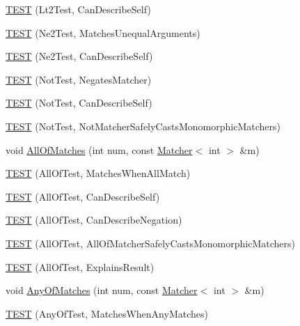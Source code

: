 \begin{DoxyCompactItemize}
\item 
\hyperlink{namespacetesting_1_1gmock__matchers__test_a9f557c4688b2907704650cc18cfd9dcf}{T\+E\+ST} (Lt2\+Test, Can\+Describe\+Self)
\item 
\hyperlink{namespacetesting_1_1gmock__matchers__test_a69692057d2825f6fc8a37265667867c7}{T\+E\+ST} (Ne2\+Test, Matches\+Unequal\+Arguments)
\item 
\hyperlink{namespacetesting_1_1gmock__matchers__test_acedf2eda13385067ee70bdb7d6073427}{T\+E\+ST} (Ne2\+Test, Can\+Describe\+Self)
\item 
\hyperlink{namespacetesting_1_1gmock__matchers__test_ab41b57eeaea5568064b6ed3725316c73}{T\+E\+ST} (Not\+Test, Negates\+Matcher)
\item 
\hyperlink{namespacetesting_1_1gmock__matchers__test_a831db2bf90c3950953cdceaefebddd40}{T\+E\+ST} (Not\+Test, Can\+Describe\+Self)
\item 
\hyperlink{namespacetesting_1_1gmock__matchers__test_a46849e0c019e331f830ed91137fa417a}{T\+E\+ST} (Not\+Test, Not\+Matcher\+Safely\+Casts\+Monomorphic\+Matchers)
\item 
void \hyperlink{namespacetesting_1_1gmock__matchers__test_a51d8731c3824a6acdaa594645dd46779}{All\+Of\+Matches} (int num, const \hyperlink{classtesting_1_1_matcher}{Matcher}$<$ int $>$ \&m)
\item 
\hyperlink{namespacetesting_1_1gmock__matchers__test_a7714d041eb2dd2e233db7f175fedef5a}{T\+E\+ST} (All\+Of\+Test, Matches\+When\+All\+Match)
\item 
\hyperlink{namespacetesting_1_1gmock__matchers__test_a31056975d89eea2786997cf18b086bf4}{T\+E\+ST} (All\+Of\+Test, Can\+Describe\+Self)
\item 
\hyperlink{namespacetesting_1_1gmock__matchers__test_a86c15b3bc163321c7a56aeb0b1709b87}{T\+E\+ST} (All\+Of\+Test, Can\+Describe\+Negation)
\item 
\hyperlink{namespacetesting_1_1gmock__matchers__test_a4196a4000390e2378954d55b4f6d2893}{T\+E\+ST} (All\+Of\+Test, All\+Of\+Matcher\+Safely\+Casts\+Monomorphic\+Matchers)
\item 
\hyperlink{namespacetesting_1_1gmock__matchers__test_a2b9f4a791dd4f1fb9f8a1400883a5db4}{T\+E\+ST} (All\+Of\+Test, Explains\+Result)
\item 
void \hyperlink{namespacetesting_1_1gmock__matchers__test_aa4e9deb0a98413e62516451e7c060c7a}{Any\+Of\+Matches} (int num, const \hyperlink{classtesting_1_1_matcher}{Matcher}$<$ int $>$ \&m)
\item 
\hyperlink{namespacetesting_1_1gmock__matchers__test_a4949d40a1ac77182274189c21848af00}{T\+E\+ST} (Any\+Of\+Test, Matches\+When\+Any\+Matches)

\end{DoxyCompactItemize}
